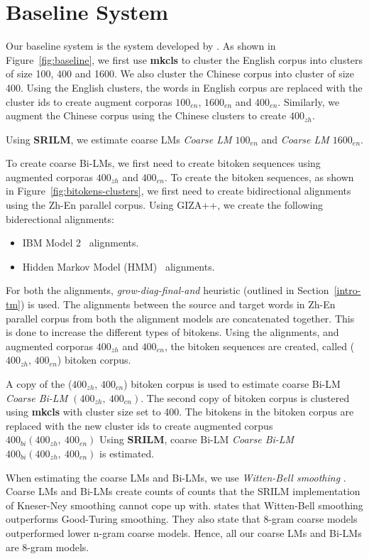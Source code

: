 \section{Baseline System}\label{three-baseline}
Our baseline system is the system developed by \cite{Stewart2014}. As shown in Figure~\ref{fig:baseline}, we first use \textbf{mkcls} to cluster the English corpus into clusters of size 100, 400 and 1600. We also cluster the Chinese corpus into cluster of size 400. Using the English clusters, the words in English corpus are replaced with the cluster ids to create augment corporas $100_{en}$, $1600_{en}$ and $400_{en}$. Similarly, we augment the Chinese corpus using the Chinese clusters to create $400_{zh}$.

Using \textbf{SRILM}, we estimate coarse LMs \textit{Coarse LM $100_{en}$} and \textit{Coarse LM $1600_{en}$}.

To create coarse Bi-LMs, we first need to create bitoken sequences using augmented corporas $400_{zh}$ and $400_{en}$. To create the bitoken sequences, as shown in Figure~\ref{fig:bitokens-clusters}, we first need to create bidirectional alignments using the Zh-En parallel corpus. Using GIZA++\cite{Och2003}, we create the following biderectional alignments:
\begin{itemize}
	\item IBM Model 2~\cite{Brown1993} alignments.
	\item Hidden Markov Model (HMM)~\cite{Och2003} alignments. 
\end{itemize}
For both the alignments, \textit{grow-diag-final-and} heuristic (outlined in Section~\ref{intro-tm}) is used. The alignments between the source and target words in Zh-En parallel corpus from both the alignment models are concatenated together. This is done to increase the different types of bitokens. Using the alignments, and augmented corporas $400_{zh}$ and $400_{en}$, the bitoken sequences are created, called ($400_{zh}$, $400_{en}$) bitoken corpus.

A copy of the ($400_{zh}$, $400_{en}$) bitoken corpus is used to estimate coarse Bi-LM \textit{Coarse Bi-LM $(400_{zh},\ 400_{en})$}. The second copy of bitoken corpus is clustered using \textbf{mkcls} with cluster size set to 400. The bitokens in the bitoken corpus are replaced with the new cluster ids to create augmented corpus $400_{bi}(400_{zh},\ 400_{en})$ Using \textbf{SRILM}, coarse Bi-LM \textit{Coarse Bi-LM $400_{bi}(400_{zh},\ 400_{en})$} is estimated.

When estimating the coarse LMs and Bi-LMs, we use \textit{Witten-Bell smoothing} \cite{WittenBell1991}. Coarse LMs and Bi-LMs create counts of counts that the SRILM implementation of Kneser-Ney smoothing cannot cope up with. \cite{Stewart2014} states that Witten-Bell smoothing outperforms Good-Turing smoothing. They also state that 8-gram coarse models outperformed lower n-gram coarse models. Hence, all our coarse LMs and Bi-LMs are 8-gram models.

